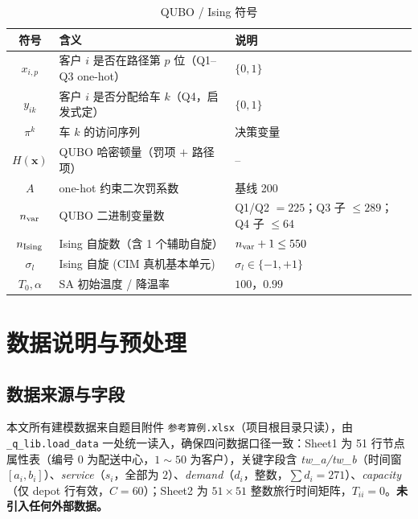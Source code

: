\documentclass[UTF8,12pt,a4paper]{ctexart}
\begin{document}
\begin{table}[H]
    \centering
    \caption{QUBO / Ising 符号}
    \label{tab:sym-qubo}
    \begin{tabular}{c l l}
        \toprule
        符号 & 含义 & 说明 \\
        \midrule
        $x_{i,p}$        & 客户 $i$ 是否在路径第 $p$ 位（Q1--Q3 one-hot）   & $\{0,1\}$ \\
        $y_{ik}$         & 客户 $i$ 是否分配给车 $k$（Q4，启发式定）        & $\{0,1\}$ \\
        $\pi^{k}$        & 车 $k$ 的访问序列                               & 决策变量 \\
        $H(\mathbf{x})$  & QUBO 哈密顿量（罚项 $+$ 路径项）                 & -- \\
        $A$              & one-hot 约束二次罚系数                            & 基线 200 \\
        $n_{\rm var}$    & QUBO 二进制变量数                                & Q1/Q2 $=225$；Q3 子 $\le 289$；Q4 子 $\le 64$ \\
        $n_{\rm Ising}$  & Ising 自旋数（含 1 个辅助自旋）                  & $n_{\rm var}+1\le 550$ \\
        $\sigma_l$       & Ising 自旋 (CIM 真机基本单元)                   & $\sigma_l\!\in\!\{-1,+1\}$ \\
        $T_0,\alpha$     & SA 初始温度 / 降温率                             & $100$，$0.99$ \\
        \bottomrule
    \end{tabular}
\end{table}

\section{数据说明与预处理}

\subsection{数据来源与字段}

本文所有建模数据来自题目附件 \texttt{参考算例.xlsx}（项目根目录只读），由 \texttt{\_q\_lib.load\_data} 一处统一读入，确保四问数据口径一致：Sheet1 为 51 行节点属性表（编号 $0$ 为配送中心，$1\!\sim\!50$ 为客户），关键字段含 \textit{tw\_a/tw\_b}（时间窗 $[a_i,b_i]$）、\textit{service}（$s_i$，全部为 $2$）、\textit{demand}（$d_i$，整数，$\sum d_i=271$）、\textit{capacity}（仅 depot 行有效，$C=60$）；Sheet2 为 $51\!\times\!51$ 整数旅行时间矩阵，$T_{ii}=0$。\textbf{未引入任何外部数据。}
\end{document}
